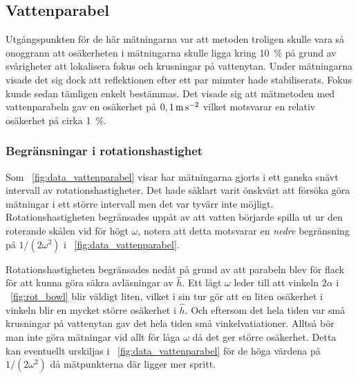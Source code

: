 \documentclass[11pt,a4paper]{article}
\newcommand{\figref}{\figurename~\ref}
\begin{document}



\subsection{Vattenparabel}
Utgångspunkten för de här mätningarna var att metoden troligen skulle vara så onoggrann att osäkerheten i mätningarna skulle ligga kring 10~\% på grund av svårigheter att lokalisera fokus och krusningar på vattenytan. Under mätningarna visade det sig dock att reflektionen efter ett par minuter hade stabiliserats. Fokus kunde sedan tämligen enkelt bestämmas. Det visade sig att mätmetoden med vattenparabeln gav en osäkerhet på $\unit[0,1]{m\,s^{-2}}$ vilket motsvarar en relativ osäkerhet på cirka 1~\%. 


\subsubsection{Begränsningar i rotationshastighet}
Som \figref{fig:data_vattenparabel} visar har mätningarna gjorts i ett ganska snävt intervall av rotationshastigheter. Det hade såklart varit önskvärt att försöka göra mätningar i ett större intervall men det var tyvärr inte möjligt. Rotationshastigheten begränsades uppåt av att vatten börjarde spilla ut ur den roterande skålen vid för högt $\omega$, notera att detta motsvarar en \emph{nedre} begränsning på $1/(2\omega^2)$ i \figref{fig:data_vattenparabel}. 

Rotationshastigheten begränsades nedåt på grund av att parabeln blev för flack för att kunna göra säkra avläsningar av $\hat{h}$. Ett lågt $\omega$ leder till att vinkeln $2\alpha$ i \figref{fig:rot_bowl} blir väldigt liten, vilket i sin tur gör att en liten osäkerhet i vinkeln blir en mycket större osäkerhet i $\hat{h}$. Och eftersom det hela tiden var små krusningar på vattenytan gav det hela tiden små vinkelvatiationer. Alltså bör man inte göra mätningar vid allt för låga $\omega$ då det ger större osäkerhet. Detta kan eventuellt urskiljas i \figref{fig:data_vattenparabel} för de höga värdena på $1/(2\omega^2)$ då mätpunkterna där ligger mer spritt.
\end{document}
